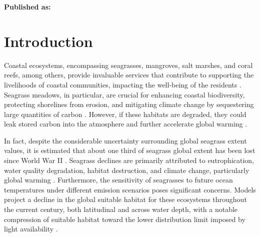 




\textbf{Published as:}

\vspace{0.5cm}


\newpage
\section{Introduction}

Coastal ecosystems, encompassing seagrasses, mangroves, salt marshes, and coral
reefs, among others, provide invaluable services that contribute to supporting
the livelihoods of coastal communities, impacting the well-being of the
residents \cite{MEA2005,IUCN2008}. Seagrass meadows, in particular, are crucial
for enhancing coastal biodiversity, protecting shorelines from erosion, and
mitigating climate change by sequestering large quantities of carbon
\cite{DuarteNCC2013,Mcleod2011}. However, if these habitats are degraded, they
could leak stored carbon into the atmosphere and further accelerate global
warming \cite{DuarteNCC2013,Macreadie2014}.

In fact, despite the considerable uncertainty surrounding global seagrass
extent values, it is estimated that about one third of seagrass global extent
has been lost since World War II \cite{DuarteNCC2013}. Seagrass declines are
primarily attributed to eutrophication, water quality degradation, habitat
destruction, and climate change, particularly global warming
\cite{Waycott2009}. Furthermore, the
sensitivity of seagrasses to future ocean temperatures under different emission
scenarios poses significant concerns. Models project a decline in the global
suitable habitat for these ecosystems throughout the current century, both
latitudinal and across water depth, with a notable compression of suitable
habitat toward the lower distribution limit imposed by light availability
\cite{Jorda2020}.

